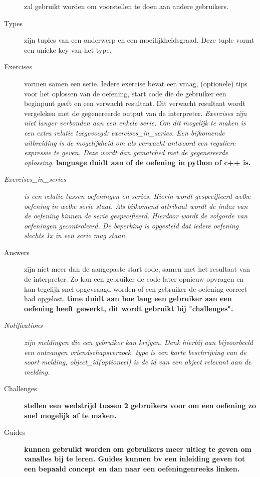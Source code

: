 \begin{description}
        zal gebruikt worden om voorstellen te doen aan andere gebruikers.
    \item[Types] zijn tuples van een onderwerp en een moeilijkheidsgraad. Deze tuple vormt een
        unieke key van het type.
    \item[Exercises] vormen samen een serie. Iedere exercise bevat een vraag, (optionele) tips voor
        het oplossen van de oefening, start code die de gebruiker een beginpunt geeft en een verwacht resultaat.
        Dit verwacht resultaat wordt vergeleken met de gegenereerde output van de interpreter. \textsl{Exercises
        zijn niet langer verbonden aan een enkele serie. Om dit mogelijk te maken is een extra relatie toegevoegd:
        exercises\_in\_series. Een bijkomende uitbreiding is de mogelijkheid om als verwacht antwoord een reguliere
        expressie te geven. Deze wordt dan gematched met de gegenereerde oplossing.}
        \textbf{language duidt aan of de oefening in python of c++ is.}
    \item[\textsl{Exercises\_in\_series}] \textsl{is een relatie tussen oefeningen en series. Hierin wordt gespecifieerd welke oefening
        in welke serie staat. Als bijkomend attribuut wordt de index van de oefening binnen de serie gespecifieerd.
        Hierdoor wordt de volgorde van oefeningen gecontroleerd. De beperking is opgesteld dat iedere oefening slechts 1x
        in een serie mag staan.}
    \item[Answers] zijn niet meer dan de aangepaste start code, samen met het resultaat
        van de interpreter. Zo kan een gebruiker de code later opnieuw opvragen en kan tegelijk snel
        opgevraagd worden of een gebruiker de oefening correct had opgelost.
        \textbf{time duidt aan hoe lang een gebruiker aan een oefening heeft gewerkt, dit wordt gebruikt
        bij "challenges".}
    \item[\textsl{Notifications}] \textsl{zijn meldingen die een gebruiker kan krijgen. Denk hierbij aan bijvoorbeeld een
        ontvangen vriendschapsverzoek. type is een korte beschrijving van de soort melding, object\_id(optioneel) is
        de id van een object relevant aan de melding.}
    \item[Challenges] \textbf{stellen een wedstrijd tussen 2 gebruikers voor om een oefening zo snel mogelijk af te maken.}
    \item[Guides] \textbf{kunnen gebruikt worden om gebruikers meer uitleg te geven om vanalles bij te leren. Guides kunnen bv
        een inleiding geven tot een bepaald concept en dan naar een oefeningenreeks linken.}
\end{description}
